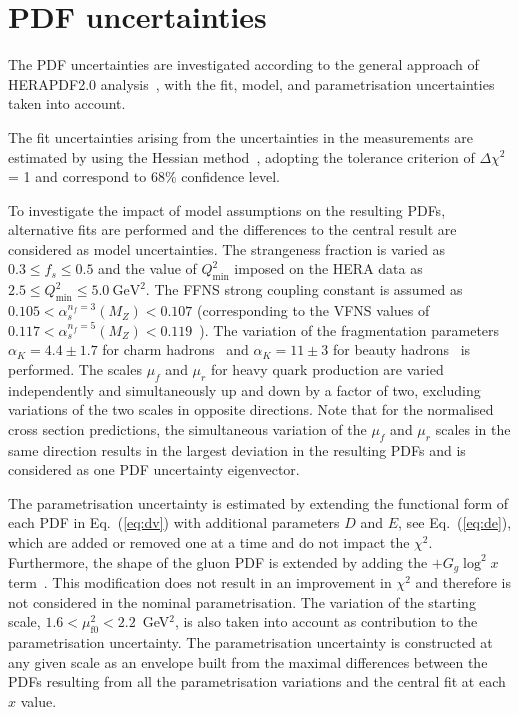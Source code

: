 \documentclass[12pt]{article}
\begin{document}
\section{PDF uncertainties}
\label{sec:pdfunc}

The PDF uncertainties are investigated according to the general approach of HERAPDF2.0 analysis~\cite{Abramowicz:2015mha}, with the fit, model, and parametrisation uncertainties taken into account.

The fit uncertainties arising from the uncertainties in the measurements are estimated by using the Hessian method~\cite{Pumplin:2001ct}, adopting the tolerance criterion of $\Delta \chi^2$ = 1 and correspond to 68\% confidence level.

To investigate the impact of model assumptions on the resulting PDFs, alternative fits are performed and the differences to the central result are considered as model uncertainties. The strangeness fraction is varied as $0.3 \leq f_{s} \leq 0.5$ and the value of $Q^2_{\text{min}}$ imposed on the HERA data as $2.5 \leq Q^2_\textrm{min}\leq 5.0~\textrm{GeV}^2$. The FFNS strong coupling constant is assumed as $0.105 < \alpha_s^{n_f=3}(M_Z) < 0.107$ (corresponding to the VFNS values of $0.117 < \alpha_s^{n_f=5}(M_Z) < 0.119$~\cite{Tanabashi:2018oca}). The variation of the fragmentation parameters $\alpha_K = 4.4 \pm 1.7$ for charm hadrons~\cite{Aaron:2008ac,Chekanov:2008ur} and $\alpha_K = 11 \pm 3$ for beauty hadrons~\cite{Nason:1999zj} is performed.
The scales $\mu_f$ and $\mu_r$ for heavy quark production are varied independently and simultaneously up and down by a factor of two, excluding variations of the two scales in opposite directions. Note that for 
the normalised cross section predictions, the simultaneous variation of the $\mu_f$ and $\mu_r$ scales in the same direction results in the largest deviation in the 
resulting PDFs and is considered as one PDF uncertainty eigenvector.

The parametrisation uncertainty is estimated by extending the functional form of each PDF in Eq.~(\ref{eq:dv}) with additional parameters $D$ and $E$, see Eq.~(\ref{eq:de}), 
which are added or removed one at a time and do not impact the $\chi^2$. 
Furthermore, the shape of the gluon PDF is extended by adding the $+G_g\log^2 x$ term~\cite{Bonvini:2019wxf}. This modification does not result in an improvement in $\chi^2$ and therefore is not considered in the nominal parametrisation. 
The variation of the starting scale, $1.6 < \mu_\mathrm{f0}^2 < 2.2$~GeV$^2$, is also taken into account as contribution to the parametrisation uncertainty. The parametrisation uncertainty is constructed at any given scale as an envelope built from the maximal differences between the PDFs resulting from all the parametrisation variations and the central fit at each $x$ value.
\end{document}
